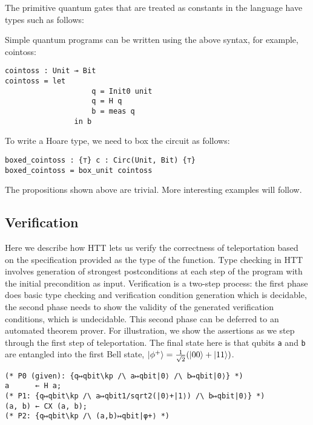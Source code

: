 \documentclass[acmsmall,nonacm,timestamp]{acmart}
\newcommand{\type}[1]{\textrm{\textbf{#1}}}
\begin{document}
The primitive quantum gates that are treated as constants in the language have types such as follows:

Simple quantum programs can be written using the above syntax, for example, cointoss:

\begin{lstlisting}
cointoss : Unit ⊸ Bit
cointoss = let
					q = Init0 unit
					q = H q
					b = meas q
				in b
\end{lstlisting}

To write a Hoare type, we need to box the circuit as follows:

\begin{lstlisting}
boxed_cointoss : {⊤} c : Circ(Unit, Bit) {⊤}
boxed_cointoss = box_unit cointoss
\end{lstlisting}

The propositions shown above are trivial. More interesting examples will follow.

\subsection{Verification}
Here we describe how HTT lets us verify the correctness of teleportation based on the specification provided as the type of the function. Type checking in HTT involves generation of strongest postconditions at each step of the program with the initial precondition as input. Verification is a two-step process: the first phase does basic type checking and verification condition generation which is decidable, the second phase needs to show the validity of the generated verification conditions, which is undecidable. This second phase can be deferred to an automated theorem prover. For illustration, we show the assertions as we step through the first step of teleportation. The final state here is that qubits \lstinline{a} and \lstinline{b} are entangled into the first Bell state, $\ket{\phi^+} = \frac{1}{\sqrt{2}}(\ket{00} + \ket{11})$.

\begin{lstlisting}
(* P0 (given): {q↦qbit\kp /\ a↦qbit|0⟩ /\ b↦qbit|0⟩} *)
a      ← H a;
(* P1: {q↦qbit\kp /\ a↦qbit1/sqrt2(|0⟩+|1⟩) /\ b↦qbit|0⟩} *)
(a, b) ← CX (a, b);
(* P2: {q↦qbit\kp /\ (a,b)↦qbit|φ+⟩ *)
\end{lstlisting}
\end{document}
